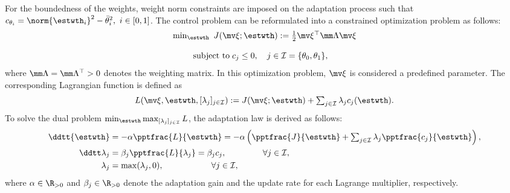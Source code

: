 \documentclass[letterpaper, 10 pt, conference]{ieeeconf}  %
\begin{document}
For the boundedness of the weights, weight norm constraints are imposed on the adaptation process such that $c_{\theta_i}=\norm{{\estwth}_i}^2-\bar\theta^2_i,\ i\in[0,1]$.
The control problem can be reformulated into a constrained optimization problem as follows:
\begin{equation}
    \begin{matrix}
        \min_{{\estwth}} \ J(\mv \xi;{\estwth})
        :=
        {1\over 2}
        \mv \xi^\top \mm \Lambda \mv \xi
        \\ \\
        \begin{aligned}
        \text{subject to\;}&c_{j}\le0, \quad j\in\mathcal I 
        = 
        \{\theta_0,\theta_1\}
        ,
        \end{aligned}
    \end{matrix}
\end{equation}
where $\mm \Lambda=\mm \Lambda^\top >0$ denotes the weighting matrix.
In this optimization problem, $\mv \xi$ is considered a predefined parameter.
The corresponding Lagrangian function is defined as
\begin{equation}
    L(
        \mv \xi,
        {\estwth},
        [\lambda_j]_{j\in\mathcal I}
    )
    := 
    J(\mv \xi;{\estwth})
    +
    \textstyle\sum_{j\in\mathcal I} \lambda_jc_j({\estwth})
    .
\end{equation}
To solve the dual problem $\min_{{\estwth}} \max_{[\lambda_j]_{j\in\mathcal I}}  L$, the adaptation law is derived as follows:
\begin{subequations}
    \begin{align}
            \ddtt {{\estwth}}
            &
            =
            -\alpha 
            \pptfrac{L}{{\estwth}}
            =-\alpha 
            \left(
                \pptfrac{J}{{\estwth}}
                +
                \textstyle\sum_{j\in\mathcal{I}}
                \lambda_j 
                \pptfrac{c_j}{\estwth}
            \right),
        \label{eq. adaptation law th}
            \\
            \ddtt\lambda_j
            & 
            = 
            \beta_j
            \pptfrac{L}{\lambda_j} 
            = 
            \beta_j c_j ,
            \quad\quad\quad\quad      \      
            \forall j\in\mathcal I,
        \label{eq. adaptation law L}
            \\
            \lambda_j 
            & 
            = 
            \max(\lambda_j,0) ,
            \quad\quad\quad\quad\ \ \ \ \ 
            \forall j\in\mathcal I,
        \label{eq. adaptation law L max}
    \end{align}
    \label{eq. adaptation laws}
\end{subequations}
where $\alpha\in\R_{>0}$ and $\beta_j\in\R_{>0}$ denote the adaptation gain and the update rate for each Lagrange multiplier, respectively.
\color{red}
\color{black}
\end{document}
